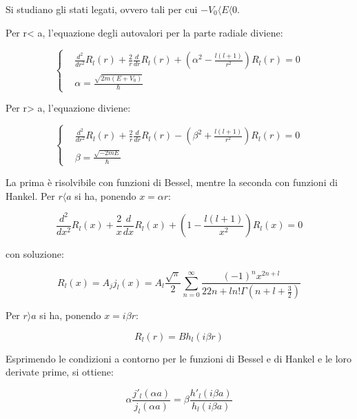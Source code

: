 \documentclass{report}
\begin{document}
Si studiano gli stati legati, ovvero tali per cui $-V_0\langle E\langle 0$.

Per r< a, l'equazione degli autovalori per la parte radiale diviene:

\begin{equation}
  \left\{
  \begin{aligned}
     & \frac{d^2}{dr^2}R_l(r)+\frac{2}{r}\frac{d}{dr}R_l(r)+\left(\alpha^2-\frac{l(l+1)}{r^2}\right)R_l(r)=0 \\
     & \alpha=\frac{\sqrt{2m(E+V_0)}}{\hbar}
  \end{aligned}
  \right.
\end{equation}

Per r> a, l'equazione diviene:

\begin{equation}
  \left\{
  \begin{aligned}
     & \frac{d^2}{dr^2}R_l(r)+\frac{2}{r}\frac{d}{dr}R_l(r)-\left(\beta^2+\frac{l(l+1)}{r^2}\right)R_l(r)=0 \\
     & \beta=\frac{\sqrt{-2mE}}{\hbar}
  \end{aligned}
  \right.
\end{equation}


La prima è risolvibile con funzioni di Bessel, mentre la seconda con funzioni di Hankel.
Per $r\langle a$ si ha, ponendo $x=\alpha r$:

\begin{equation}
  \frac{d^2}{dx^2}R_l(x)+\frac{2}{x}\frac{d}{dx}R_l(x)+\left(1-\frac{l(l+1)}{x^2}\right)R_l(x)=0
\end{equation}

con soluzione:

\begin{equation}
  R_l(x)=A_j j_l(x)=A_l \frac{\sqrt{\pi}}{2}\sum_{n=0}^{\infty}\frac{(-1)^nx^{2n+l}}{2{2n+l}n!\Gamma(n+l+\frac{3}{2})}
\end{equation}

Per $r\rangle a$ si ha, ponendo $x=i\beta r$:

\begin{equation}
  R_l(r)=Bh_l(i\beta r)
\end{equation}

Esprimendo le condizioni a contorno per le funzioni di Bessel e di Hankel e le loro derivate prime, si ottiene:

\begin{equation}
  \alpha \frac{j'_l(\alpha a)}{j_l(\alpha a)}=\beta \frac{h'_l(i\beta a)}{h_l(i\beta a)}
\end{equation}
\end{document}
